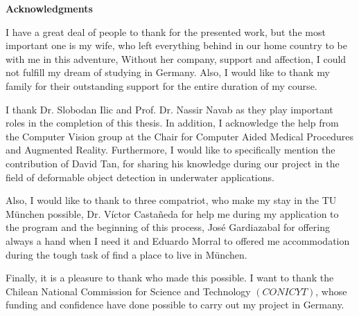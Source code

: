 \clearemptydoublepage
{}
{}	



\vspace*{2cm}

\begin{center}
{\Large \bf Acknowledgments}
\end{center}

\vspace{1cm}

I have a great deal of people to thank for the presented work, but the most important
one is my wife, who left everything behind in our home country to be with me in this
adventure, Without her company, support and affection, I could not fulfill
my dream of studying in Germany.
Also, I would like to thank my family for their outstanding support for the entire
duration of my course.

I thank Dr. Slobodan Ilic and Prof. Dr. Nassir Navab as they
play important roles in the completion of this thesis. In addition, I acknowledge the
help from the Computer Vision group at the Chair for Computer Aided Medical Procedures
and Augmented Reality. Furthermore, I would like to specifically mention the contribution
of David Tan, for sharing his knowledge during our project in the field of deformable
object detection in underwater applications.

Also, I would like to thank to three compatriot, who make my stay in the TU M{\"u}nchen possible, 
Dr. V\'{i}ctor Casta\~{n}eda for help me during my application to the program and
the beginning of this process, Jos\'{e} Gardiazabal for offering always a hand 
when I need it and Eduardo Morral to offered me accommodation during the tough task of 
find a place to live in M{\"u}nchen.

Finally, it is a pleasure to  thank who made this possible. I want to thank the Chilean National
Commission for Science and Technology $(CONICYT)$, whose funding and confidence have
done possible to carry out my project in Germany.




